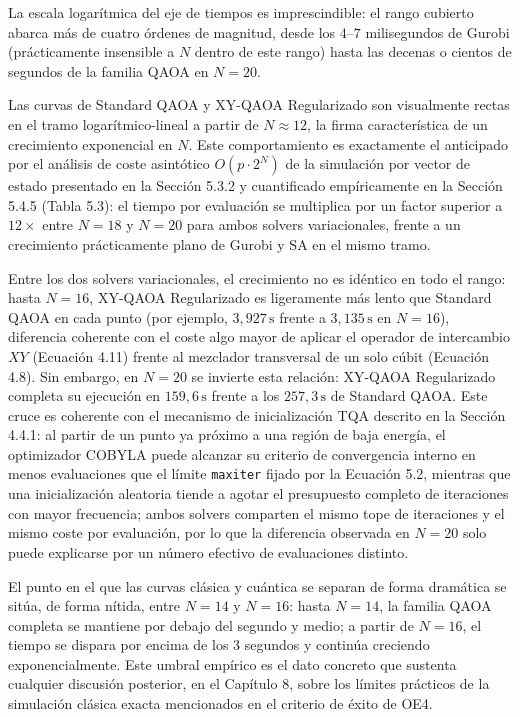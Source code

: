La escala logarítmica del eje de tiempos es imprescindible: el rango cubierto abarca más de cuatro órdenes de magnitud, desde los $4$--$7$ milisegundos de Gurobi (prácticamente insensible a $N$ dentro de este rango) hasta las decenas o cientos de segundos de la familia QAOA en $N=20$.

Las curvas de Standard QAOA y XY-QAOA Regularizado son visualmente rectas en el tramo logarítmico-lineal a partir de $N\approx12$, la firma característica de un crecimiento exponencial en $N$. Este comportamiento es exactamente el anticipado por el análisis de coste asintótico $O(p\cdot 2^N)$ de la simulación por vector de estado presentado en la Sección 5.3.2 y cuantificado empíricamente en la Sección 5.4.5 (Tabla 5.3): el tiempo por evaluación se multiplica por un factor superior a $12\times$ entre $N=18$ y $N=20$ para ambos solvers variacionales, frente a un crecimiento prácticamente plano de Gurobi y SA en el mismo tramo.

Entre los dos solvers variacionales, el crecimiento no es idéntico en todo el rango: hasta $N=16$, XY-QAOA Regularizado es ligeramente más lento que Standard QAOA en cada punto (por ejemplo, $3{,}927\,\text{s}$ frente a $3{,}135\,\text{s}$ en $N=16$), diferencia coherente con el coste algo mayor de aplicar el operador de intercambio $XY$ (Ecuación 4.11) frente al mezclador transversal de un solo cúbit (Ecuación 4.8). Sin embargo, en $N=20$ se invierte esta relación: XY-QAOA Regularizado completa su ejecución en $159{,}6\,\text{s}$ frente a los $257{,}3\,\text{s}$ de Standard QAOA. Este cruce es coherente con el mecanismo de inicialización TQA descrito en la Sección 4.4.1: al partir de un punto ya próximo a una región de baja energía, el optimizador COBYLA puede alcanzar su criterio de convergencia interno en menos evaluaciones que el límite \texttt{maxiter} fijado por la Ecuación 5.2, mientras que una inicialización aleatoria tiende a agotar el presupuesto completo de iteraciones con mayor frecuencia; ambos solvers comparten el mismo tope de iteraciones y el mismo coste por evaluación, por lo que la diferencia observada en $N=20$ solo puede explicarse por un número efectivo de evaluaciones distinto.

El punto en el que las curvas clásica y cuántica se separan de forma dramática se sitúa, de forma nítida, entre $N=14$ y $N=16$: hasta $N=14$, la familia QAOA completa se mantiene por debajo del segundo y medio; a partir de $N=16$, el tiempo se dispara por encima de los $3$ segundos y continúa creciendo exponencialmente. Este umbral empírico es el dato concreto que sustenta cualquier discusión posterior, en el Capítulo 8, sobre los límites prácticos de la simulación clásica exacta mencionados en el criterio de éxito de OE4.

